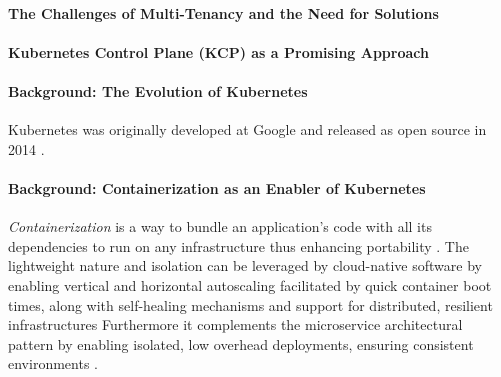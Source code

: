 \documentclass[11pt, a4paper, oneside, draft]{scrartcl}
\begin{document}
            \paragraph{The Challenges of Multi-Tenancy and the Need for Solutions}

            \paragraph{Kubernetes Control Plane (KCP) as a Promising Approach}

            \paragraph{Background: The Evolution of Kubernetes}
                Kubernetes was originally developed at Google and released as open source in 2014
                \parencite{googlecloudWhatIsKubernetes}.

            \paragraph{Background: Containerization as an Enabler of Kubernetes}
                \textit{Containerization} is a way to bundle an application's code with all its
                dependencies to run on any infrastructure thus enhancing portability
                \parencite{awsWhatIsContainerization,dockerWhatContainer}.
                The lightweight nature and isolation can be leveraged by cloud-native software by
                enabling vertical and horizontal autoscaling facilitated by quick container boot
                times, along with self-healing mechanisms and support for distributed, resilient
                infrastructures \parencites{kubernetesAutoscalingWorkloads}{kubernetesSelfHealing}
                    {awsWhatIsContainerization}[pp.~58--59]{davis2019}
                Furthermore it complements the microservice architectural pattern by enabling
                isolated, low overhead deployments, ensuring consistent environments
                \parencite[209]{balalaie2016}.
\end{document}
